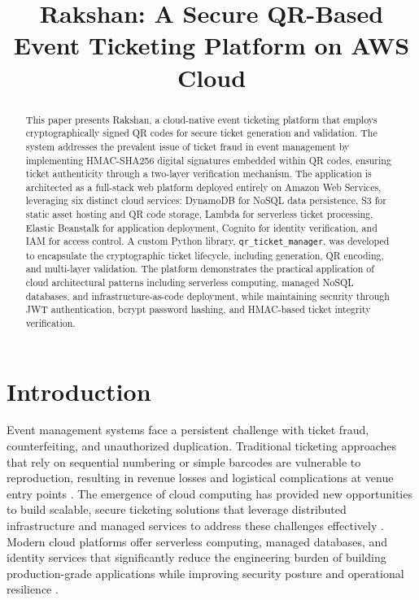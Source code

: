 \documentclass[conference]{IEEEtran}
\begin{document}
\title{Rakshan: A Secure QR-Based Event Ticketing Platform on AWS Cloud}

\author{
}

\maketitle

\begin{abstract}
This paper presents Rakshan, a cloud-native event ticketing platform that employs cryptographically signed QR codes for secure ticket generation and validation. The system addresses the prevalent issue of ticket fraud in event management by implementing HMAC-SHA256 digital signatures embedded within QR codes, ensuring ticket authenticity through a two-layer verification mechanism. The application is architected as a full-stack web platform deployed entirely on Amazon Web Services, leveraging six distinct cloud services: DynamoDB for NoSQL data persistence, S3 for static asset hosting and QR code storage, Lambda for serverless ticket processing, Elastic Beanstalk for application deployment, Cognito for identity verification, and IAM for access control. A custom Python library, \texttt{qr\_ticket\_manager}, was developed to encapsulate the cryptographic ticket lifecycle, including generation, QR encoding, and multi-layer validation. The platform demonstrates the practical application of cloud architectural patterns including serverless computing, managed NoSQL databases, and infrastructure-as-code deployment, while maintaining security through JWT authentication, bcrypt password hashing, and HMAC-based ticket integrity verification.
\end{abstract}

\section{Introduction}

Event management systems face a persistent challenge with ticket fraud, counterfeiting, and unauthorized duplication. Traditional ticketing approaches that rely on sequential numbering or simple barcodes are vulnerable to reproduction, resulting in revenue losses and logistical complications at venue entry points \cite{nair2019}. The emergence of cloud computing has provided new opportunities to build scalable, secure ticketing solutions that leverage distributed infrastructure and managed services to address these challenges effectively \cite{mell2011}. Modern cloud platforms offer serverless computing, managed databases, and identity services that significantly reduce the engineering burden of building production-grade applications while improving security posture and operational resilience \cite{jonas2019}.
\end{document}
